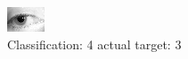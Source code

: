 \begin{figure}[h!]
\begin{center}
\includegraphics[width=0.60\columnwidth]{figures/ID1384_class_4_target_3.png}
\end{center}
\caption{ Classification: 4 actual target: 3}
\label{fig:ID1384_class_4_target_3}
\end{figure}
